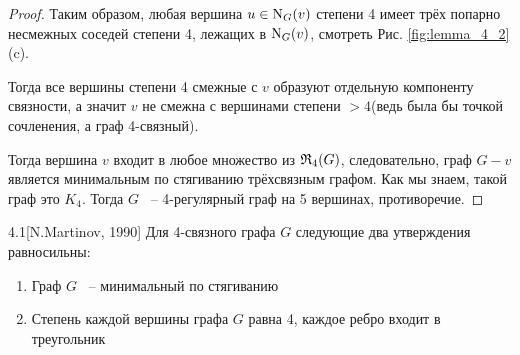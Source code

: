 \begin{proof}
	Таким образом, любая вершина $u \in \operatorname{N}_G(v)$ степени 4 имеет трёх попарно несмежных соседей степени 4, лежащих в  $\operatorname{N}_G(v)$, смотреть Рис. \ref{fig:lemma_4_2}(c).

	Тогда все вершины степени 4 смежные с $v$ образуют отдельную компоненту связности, а значит  $v$ не смежна с вершинами степени $> 4$(ведь была бы точкой сочленения, а граф 4-связный). 

	Тогда вершина  $v$ входит в любое множество из $\mathfrak{R}_4(G)$, следовательно, граф $G - v$ является минимальным по стягиванию трёхсвязным графом.
	Как мы знаем, такой граф это $K_4$.
	Тогда  $G$ ~-- 4-регулярный граф на 5 вершинах, противоречие.

\end{proof}

\begin{customthm}{4.1}[N.Martinov, 1990] \label{theorem:4_1}
	Для 4-связного графа $G$ следующие два утверждения равносильны:

	\begin{enumerate}
		\item Граф $G$ ~-- минимальный по стягиванию
		\item Степень каждой вершины графа $G$ равна 4, каждое ребро входит в треугольник
	\end{enumerate}

\end{customthm}

